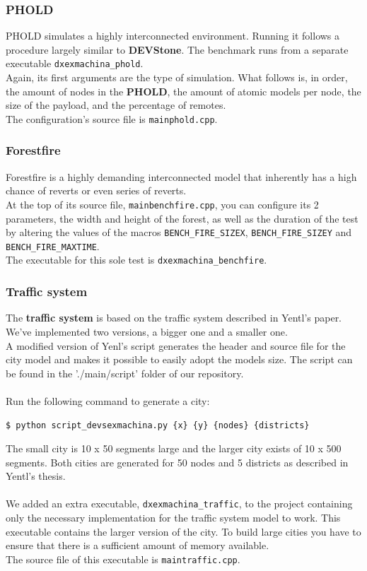 \documentclass[8pt,a4paper]{report}
\begin{document}
\subsubsection{PHOLD}
PHOLD simulates a highly interconnected environment. Running it follows a procedure largely similar to \textbf{DEVStone}. The benchmark runs from a separate executable \texttt{dxexmachina\_phold}.\\
Again, its first arguments are the type of simulation. What follows is, in order, the amount of nodes in the \textbf{PHOLD}, the amount of atomic models per node, the size of the payload, and the percentage of remotes.\\
The configuration's source file is \texttt{mainphold.cpp}.

\subsubsection{Forestfire}
Forestfire is a highly demanding interconnected model that inherently has a high chance of reverts or even series of reverts.\\
At the top of its source file, \texttt{mainbenchfire.cpp}, you can configure its 2 parameters, the width and height of the forest, as well as the duration of the test by altering the values of the macros \texttt{BENCH\_FIRE\_SIZEX}, \texttt{BENCH\_FIRE\_SIZEY} and \texttt{BENCH\_FIRE\_MAXTIME}.\\

The executable for this sole test is \texttt{dxexmachina\_benchfire}.

\subsubsection{Traffic system}
The \textbf{traffic system} is based on the traffic system described in Yentl's paper. We've implemented two versions, a bigger one and a smaller one.\\
A modified version of Yenl's script generates the header and source file for the city model and makes it possible to easily adopt the models size. The script can be found in the './main/script' folder of our repository.\\
\\
Run the following command to generate a city:
\begin{Verbatim}[fontsize=\small]
$ python script_devsexmachina.py {x} {y} {nodes} {districts}
\end{Verbatim}
The small city is 10 x 50 segments large and the larger city exists of 10 x 500 segments. Both cities are generated for 50 nodes and 5 districts as described in Yentl's thesis.\\
\\
We added an extra executable, \texttt{dxexmachina\_traffic}, to the project containing only the necessary implementation for the traffic system model to work. This executable contains the larger version of the city. To build large cities you have to ensure that there is a sufficient amount of memory available.\\
The source file of this executable is \texttt{maintraffic.cpp}.
\end{document}
